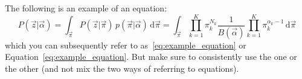 The following is an example of an equation:
\begin{equation}
P(\vec{z} | \vec{\alpha}) = \int_{\vec{\pi}} P(\vec{z} | \vec{\pi}) \, p(\vec{\pi} | \vec{\alpha}) \, \textrm{d} \vec{\pi}
= \int_{\vec{\pi}} \prod_{k = 1}^K \pi_k^{N_k} \frac{1}{B(\vec{\alpha})} \prod_{k = 1}^K \pi_k^{\alpha_k - 1} \, \textrm{d} \vec{\pi}
\label{eq:example_equation}
\end{equation}
which you can subsequently refer to as~\eqref{eq:example_equation} or Equation~\ref{eq:example_equation}.
But make sure to consistently use the one or the other (and not mix the two ways of referring to equations).
